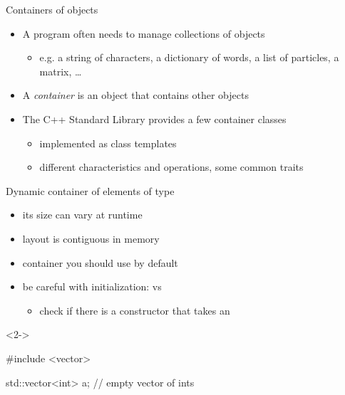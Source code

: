\begin{frame}{Containers of objects}
  \begin{itemize}
  \item A program often needs to manage collections of objects
    \begin{itemize}
    \item e.g. a string of characters, a dictionary of words, a list of
      particles, a matrix, \ldots
    \end{itemize}
  \item<2-> A \textit{container} is an object that contains other objects
  \item<2-> The C++ Standard Library provides a few container classes
    \begin{itemize}[<.->]
    \item implemented as class templates
    \item different characteristics and operations, some common traits
    \end{itemize}
  \end{itemize}
\end{frame}

\begin{frame}[fragile]{}

  \alert{Dynamic} container of elements of type 
  \begin{itemize}
  \item its size can vary at runtime
  \item layout is contiguous in memory
  \item container you should use by default
  \item<4-> be careful with initialization: \code{\{\}} vs \code{()}
    \begin{itemize}
    \item check if there is a constructor that takes an
    \end{itemize}
  \end{itemize}

  \begin{codeblock}<2->{
#include <vector>

std::vector<int> a;      // empty vector of ints

}\end{codeblock}

\end{frame}

